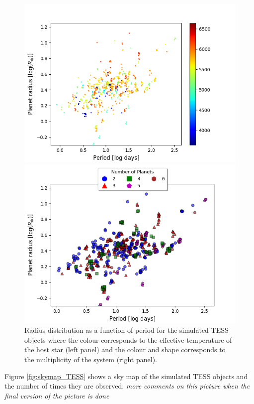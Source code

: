 \documentclass[12pt]{report}
\begin{document}
\begin{figure}[h!]
 	 \centering
 	 \begin{minipage}{.5\textwidth}
 	 \includegraphics[width=1\linewidth]{img/R_P-plot_effTemp_cut-off.png}


 	 \end{minipage}%
	\begin{minipage}{.5\textwidth}
 	 \centering
 	 \includegraphics[width=1\linewidth]{img/R_P-plot_numP1.png}
 	 

 	 \end{minipage}
 	  	 \caption{Radius distribution as a function of period for the simulated TESS objects where the colour corresponds to the effective temperature of the host star (left panel) and the colour and shape corresponds to the multiplicity of the system (right panel).}
 	  	 \label{fig:RP_plot_temp_multi}
\end{figure}
	\newpage Figure \ref{fig:skymap_TESS} shows a sky map of the simulated TESS objects and the number of times they are observed. \textit{more comments on this picture when the final version of the picture is done}
\end{document}
